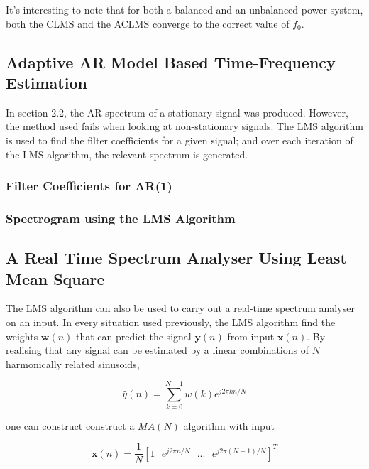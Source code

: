 \documentclass[main.tex]{subfiles}
\begin{document}
It's interesting to note that for both a balanced and an unbalanced power system, both the CLMS and the ACLMS converge to the correct value of $f_0$.


\subsection{Adaptive AR Model Based Time-Frequency Estimation}

In section 2.2, the AR spectrum of a stationary signal was produced. However, the method used fails when looking at non-stationary signals. The LMS algorithm is used to find the filter coefficients for a given signal; and over each iteration of the LMS algorithm, the relevant spectrum is generated. 

\subsubsection{Filter Coefficients for AR(1)}

\subsubsection{Spectrogram using the LMS Algorithm}







\subsection{A Real Time Spectrum Analyser Using Least Mean Square}

The LMS algorithm can also be used to carry out a real-time spectrum analyser on an input. In every situation used previously, the LMS algorithm find the weights $\textbf{w}(n)$ that can predict the signal $\textbf{y}(n)$ from input $\textbf{x}(n)$. By realising that any signal can be estimated by a linear combinations of $N$ harmonically related sinusoids,

\begin{equation}
\hat{y}(n) = \sum_{k=0}^{N-1}w(k)e^{j2\pi kn/N} \label{eq-4-3-a-yhat}
\end{equation}

one can construct construct a $MA(N)$ algorithm with input 

\begin{equation}
\textbf{x}(n) = \frac{1}{N}\left[1\ \ \ e^{j2\pi n/N}\ \ \ ...\ \ \ e^{j2\pi (N-1)/N}\right]^T
\end{equation}
\end{document}
